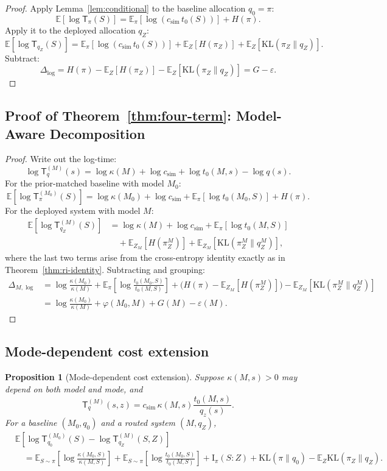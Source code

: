 \documentclass[10pt]{article}
\theoremstyle{paperplain}
\newtheorem{proposition}[theorem]{Proposition}
\theoremstyle{paperdefinition}
\theoremstyle{paperremark}
\newcommand{\KL}{\mathrm{KL}}
\newcommand{\I}{\mathrm{I}}
\newcommand{\E}{\mathbb{E}}
\newcommand{\Dlog}{\Delta_{\log}}
\newcommand{\DlogM}{\Delta_{M,\log}}
\begin{document}
\begin{proof}
Apply Lemma~\ref{lem:conditional} to the baseline allocation $q_0 = \pi$:
\[
\E\!\left[\log \mathsf{T}_\pi(S)\right]
= \E_\pi[\log(c_{\mathrm{sim}}\, t_0(S))] + H(\pi).
\]
Apply it to the deployed allocation $q_Z$:
\[
\E\!\left[\log \mathsf{T}_{q_Z}(S)\right]
= \E_\pi[\log(c_{\mathrm{sim}}\, t_0(S))] + \E_Z[H(\pi_Z)] + \E_Z[\KL(\pi_Z \| q_Z)].
\]
Subtract:
\[
\Dlog = H(\pi) - \E_Z[H(\pi_Z)] - \E_Z[\KL(\pi_Z \| q_Z)]
= G - \varepsilon.
\]
\end{proof}

\subsection{Proof of Theorem~\ref{thm:four-term}: Model-Aware Decomposition}
\label{app:proof:thm:four-term}

\begin{proof}
Write out the log-time:
\[
\log \mathsf{T}_q^{(M)}(s) = \log \kappa(M) + \log c_{\mathrm{sim}} + \log t_0(M,s) - \log q(s).
\]
For the prior-matched baseline with model $M_0$:
\[
\E\!\left[\log \mathsf{T}_\pi^{(M_0)}(S)\right]
= \log\kappa(M_0) + \log c_{\mathrm{sim}} + \E_\pi[\log t_0(M_0,S)] + H(\pi).
\]
For the deployed system with model $M$:
\begin{align*}
\E\!\left[\log \mathsf{T}_{q_Z}^{(M)}(S)\right]
&= \log\kappa(M) + \log c_{\mathrm{sim}} + \E_\pi[\log t_0(M,S)] \\
&\quad + \E_{Z_M}[H(\pi_Z^M)] + \E_{Z_M}[\KL(\pi_Z^M \| q_Z^M)],
\end{align*}
where the last two terms arise from the cross-entropy identity exactly as in Theorem~\ref{thm:ri-identity}.
Subtracting and grouping:
\begin{align*}
\DlogM &= \log\frac{\kappa(M_0)}{\kappa(M)}
+ \E_\pi\!\left[\log\frac{t_0(M_0,S)}{t_0(M,S)}\right]
+ \bigl(H(\pi) - \E_{Z_M}[H(\pi_Z^M)]\bigr)
- \E_{Z_M}[\KL(\pi_Z^M \| q_Z^M)] \\[4pt]
&= \log\frac{\kappa(M_0)}{\kappa(M)} + \varphi(M_0,M) + G(M) - \varepsilon(M).
\end{align*}
\end{proof}

\subsection{Mode-dependent cost extension}

\begin{proposition}[Mode-dependent cost extension]
\label{prop:mode-dependent-cost}
Suppose $\kappa(M,s)>0$ may depend on both model and mode, and
\[
\mathsf{T}_q^{(M)}(s,z)
=c_{\mathrm{sim}}\,\kappa(M,s)\frac{t_0(M,s)}{q_z(s)}.
\]
For a baseline $(M_0,q_0)$ and a routed system $(M,q_Z)$,
\[
\begin{aligned}
&\E\!\left[\log\mathsf{T}_{q_0}^{(M_0)}(S)-\log\mathsf{T}_{q_Z}^{(M)}(S,Z)\right]\\
&\quad=
\E_{S\sim\pi}\!\left[\log\frac{\kappa(M_0,S)}{\kappa(M,S)}\right]
+\E_{S\sim\pi}\!\left[\log\frac{t_0(M_0,S)}{t_0(M,S)}\right]
+\I_\pi(S:Z)+\KL(\pi\|q_0)-\E_Z\KL(\pi_Z\|q_Z).
\end{aligned}
\]
\end{proposition}
\end{document}
